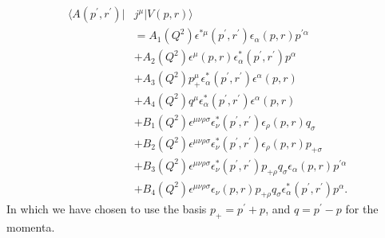 \begin{align*}
\langle A(p^\prime,r^\prime) | &j^\mu | V(p,r) \rangle \\
&= A_1(Q^2) \epsilon^{*\mu}(p^\prime,r^\prime)\epsilon_\alpha(p,r)p^{\prime\alpha} \\ 
&+ A_2(Q^2) \epsilon^\mu(p,r) \epsilon^*_\alpha(p^\prime,r^\prime)p^\alpha \\
&+ A_3(Q^2)p_+^\mu \epsilon^*_\alpha(p^\prime,r^\prime)\epsilon^\alpha(p,r) \\
&+ A_4(Q^2) q^\mu \epsilon^*_\alpha(p^\prime,r^\prime)\epsilon^\alpha(p,r) \\
&+ B_1(Q^2) \epsilon^{\mu\nu\rho\sigma}\epsilon^*_\nu(p^\prime,r^\prime)\epsilon_\rho(p,r)q_\sigma \\
&+ B_2(Q^2) \epsilon^{\mu\nu\rho\sigma}\epsilon^*_\nu(p^\prime,r^\prime)\epsilon_\rho(p,r)p_{+\sigma} \\
& + B_3(Q^2) \epsilon^{\mu\nu\rho\sigma}\epsilon^*_\nu(p^\prime,r^\prime)p_{+\rho}q_\sigma \epsilon_\alpha(p,r)p^{\prime\alpha} \\
& + B_4(Q^2) \epsilon^{\mu\nu\rho\sigma}\epsilon_\nu(p,r)p_{+\rho}q_\sigma \epsilon^*_\alpha(p^\prime,r^\prime)p^\alpha.
\end{align*}
In which we have chosen to use the basis $p_+ = p^\prime + p$, and $q = p^\prime -p$ for the momenta. 

